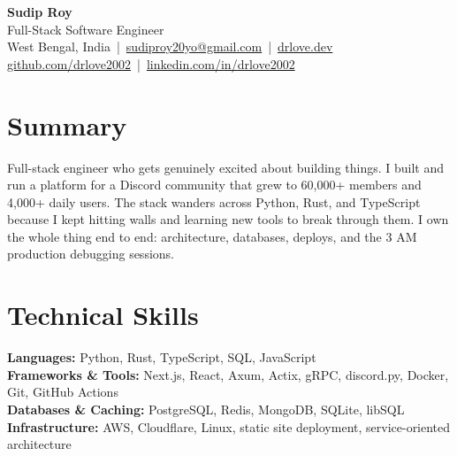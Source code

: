 \documentclass[10pt,a4paper]{article}
\newcommand{\resumeheader}[1]{\begin{center}#1\end{center}}
\begin{document}
\resumeheader{
  {\LARGE \textbf{Sudip Roy}}\\
  Full-Stack Software Engineer\\
  West Bengal, India \,|\, \href{mailto:sudiproy20yo@gmail.com}{sudiproy20yo@gmail.com} \,|\, \href{https://drlove.dev}{drlove.dev}\\
  \href{https://github.com/drlove2002}{github.com/drlove2002} \,|\, \href{https://linkedin.com/in/drlove2002}{linkedin.com/in/drlove2002}
}

\section*{Summary}
Full-stack engineer who gets genuinely excited about building things. I built and run a platform for a Discord community that grew to 60{,}000+ members and 4{,}000+ daily users. The stack wanders across Python, Rust, and TypeScript because I kept hitting walls and learning new tools to break through them. I own the whole thing end to end: architecture, databases, deploys, and the 3 AM production debugging sessions.

\section*{Technical Skills}
\textbf{Languages:} Python, Rust, TypeScript, SQL, JavaScript\\
\textbf{Frameworks \& Tools:} Next.js, React, Axum, Actix, gRPC, discord.py, Docker, Git, GitHub Actions\\
\textbf{Databases \& Caching:} PostgreSQL, Redis, MongoDB, SQLite, libSQL\\
\textbf{Infrastructure:} AWS, Cloudflare, Linux, static site deployment, service-oriented architecture
\end{document}
